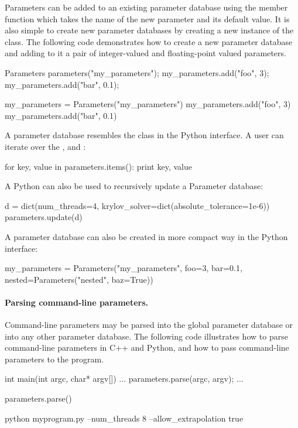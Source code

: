 Parameters can be added to an existing parameter database using the
 member function which takes the name of the new parameter
and its default value. It is also simple to create new parameter
databases by creating a new instance of the 
class. The following code demonstrates how to create a new parameter
database and adding to it a pair of integer-valued and floating-point
valued parameters.
\begin{c++}
Parameters parameters("my_parameters");
my_parameters.add("foo", 3);
my_parameters.add("bar", 0.1);
\end{c++}
\begin{python}
my_parameters = Parameters("my_parameters")
my_parameters.add("foo", 3)
my_parameters.add("bar", 0.1)
\end{python}
A parameter database resembles the  class in the Python
interface. A user can iterate over the ,  and
:
\begin{python}
for key, value in parameters.items():
    print key, value
\end{python}
A Python  can also be used to recursively update a Parameter
database:
\begin{python}
d = dict(num_threads=4, krylov_solver=dict(absolute_tolerance=1e-6))
parameters.update(d)
\end{python}
A parameter database can also be created in more compact way in the
Python interface:
\begin{python}
my_parameters = Parameters("my_parameters", foo=3, bar=0.1,
                           nested=Parameters("nested", baz=True))
\end{python}


\paragraph{Parsing command-line parameters.}

Command-line parameters may be parsed into the global parameter database
or into any other parameter database. The following code illustrates
how to parse command-line parameters in C++ and Python, and how to pass
command-line parameters to the program.
\begin{c++}
int main(int argc, char* argv[])
{
  ...
  parameters.parse(argc, argv);
  ...
}
\end{c++}
\begin{python}
parameters.parse()
\end{python}
\begin{bash}
python myprogram.py --num_threads 8 --allow_extrapolation true
\end{bash}


